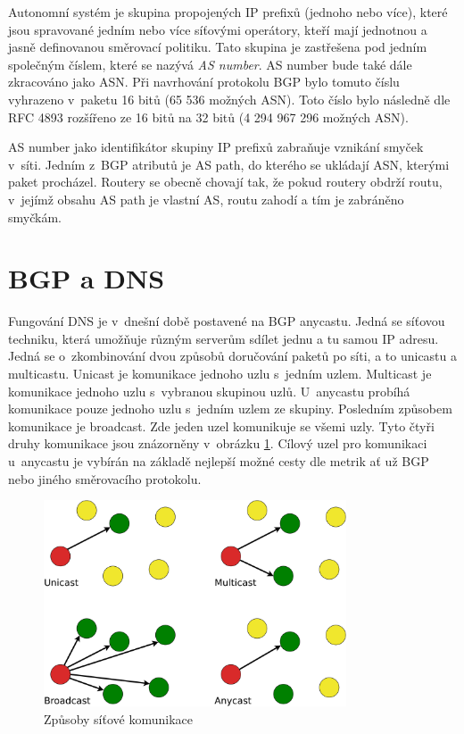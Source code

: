 \documentclass[thesis=M,czech]{src/FITthesis}[2019/12/23]
\begin{document}
Autonomní systém je skupina propojených IP prefixů (jednoho nebo více), které jsou spravované jedním nebo více síťovými operátory, kteří mají jednotnou a jasně definovanou směrovací politiku. Tato skupina je zastřešena pod jedním společným číslem, které se nazývá \textit{AS number}. AS number bude také dále zkracováno jako ASN. Při navrhování protokolu BGP bylo tomuto číslu vyhrazeno v~paketu 16 bitů (65 536 možných ASN). Toto číslo bylo následně dle RFC 4893 rozšířeno ze 16 bitů na 32 bitů (4 294 967 296 možných ASN). \cite{RFC4893}

AS number jako identifikátor skupiny IP prefixů zabraňuje vznikání smyček v~síti. Jedním z~BGP atributů je AS path, do kterého se ukládají ASN, kterými paket procházel. Routery se obecně chovají tak, že pokud routery obdrží routu, v~jejímž obsahu AS path je vlastní AS, routu zahodí a tím je zabráněno smyčkám. \cite{oreilly-bgp, RFC1654, cisco-bgp, bgp-loops}


\section{BGP a DNS}
Fungování DNS je v~dnešní době postavené na BGP anycastu. Jedná se síťovou techniku, která umožňuje různým serverům sdílet jednu a tu samou IP adresu. Jedná se o~zkombinování dvou  způsobů doručování paketů po síti, a to unicastu a multicastu. Unicast je komunikace jednoho uzlu s~jedním uzlem. Multicast je komunikace jednoho uzlu s~vybranou skupinou uzlů. U~anycastu probíhá komunikace pouze jednoho uzlu s~jedním uzlem ze skupiny. Posledním způsobem komunikace je broadcast. Zde jeden uzel komunikuje se všemi uzly. Tyto čtyři druhy komunikace jsou znázorněny v~obrázku \ref{fig:castTypes}. Cílový uzel pro komunikaci u~anycastu je vybírán na základě nejlepší možné cesty dle metrik ať už BGP nebo jiného směrovacího protokolu. \cite{bgp-anycast, unix-handbook}


\begin{figure}[ht]
  \centering
   \includegraphics[width=0.8\textwidth]{images/cast_types.pdf}	
   \caption{Způsoby síťové komunikace}
     \label{fig:castTypes}
\end{figure}
\end{document}

